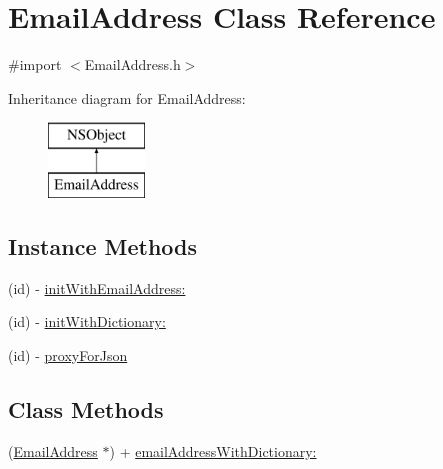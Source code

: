 \hypertarget{interface_email_address}{\section{Email\-Address Class Reference}
\label{interface_email_address}
}


{\ttfamily \#import $<$Email\-Address.\-h$>$}

Inheritance diagram for Email\-Address\-:\begin{figure}[H]
\begin{center}
\leavevmode
\includegraphics[height=2.000000cm]{interface_email_address}
\end{center}
\end{figure}
\subsection*{Instance Methods}
\begin{DoxyCompactItemize}
\item 
(id) -\/ \hyperlink{interface_email_address_aaaef47c380ddb47172ab7630853bbff6}{init\-With\-Email\-Address\-:}
\item 
(id) -\/ \hyperlink{interface_email_address_a70ff0aa37e73f488616f57258cbe36d3}{init\-With\-Dictionary\-:}
\item 
(id) -\/ \hyperlink{interface_email_address_a6973454dcb36d443353f9b890eb9564c}{proxy\-For\-Json}
\end{DoxyCompactItemize}
\subsection*{Class Methods}
\begin{DoxyCompactItemize}
\item 
(\hyperlink{interface_email_address}{Email\-Address} $\ast$) + \hyperlink{interface_email_address_a0407c30ef902b7fafbcb77207c31ab44}{email\-Address\-With\-Dictionary\-:}
\end{DoxyCompactItemize}
